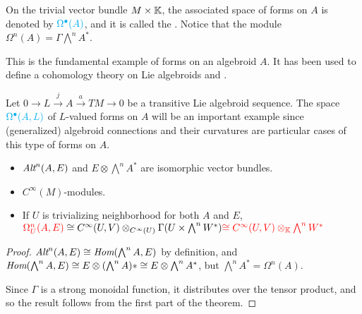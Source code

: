 \lin



\begin{example}
On the trivial vector bundle $M \times \mathbb{K}$, the associated space of forms on $A$ is denoted by $\textcolor{cyan}{\textcolor{cyan}{\Omega^\bullet(A)}}$, and it is called the . Notice that the module $\Omega^n(A) = \Gamma \bigwedge^n A^*$.

This is the fundamental example of forms on an algebroid $A$. It has been used to define a cohomology theory on Lie algebroids and .
\end{example}

\begin{example}
Let $0 \to L \xrightarrow{j} A \xrightarrow{a} TM \to 0$ be a transitive Lie algebroid sequence.
The space $\textcolor{cyan}{\Omega^\bullet(A, L)}$ of $L$-valued forms on $A$ will be an important example since (generalized) algebroid connections and their curvatures are particular cases of this type of forms on $A$.
\end{example}

\lin

\begin{theorem}\label{isomorphOmega}
    \begin{itemize}
    
    \item $\operatorname{\textit{Alt}}^n(A, E)$ and $E \otimes \bigwedge^n A^*$ are isomorphic vector bundles.
    
    
    \item {} $C^\infty(M)$-modules.
    
    \item If $U$ is trivializing neighborhood for both $A$ and $E$, $\textcolor{red}{\Omega_U^n(A, E)} \cong C^\infty(U, V) \otimes_{C^\infty(U)} \Gamma(U \times \bigwedge^n W^*) \textcolor{red}{\cong C^\infty(U, V) \otimes_{\mathbb{K}} \bigwedge^n W^*}$
    
    
    \end{itemize}
\end{theorem}

\begin{proof}
$\operatorname{\textit{Alt}}^n(A, E) \cong \operatorname{\textit{Hom}}(\bigwedge^n A, E)$ by definition, and $\operatorname{\textit{Hom}}(\bigwedge^n A, E) \cong E \otimes (\bigwedge^n A)* \cong E \otimes \bigwedge^n A^*$, but $\bigwedge^n A^* = \Omega^n(A)$.

Since $\Gamma$ is a strong monoidal function, it distributes over the tensor product, and so the result follows from the first part of the theorem.
\end{proof}

